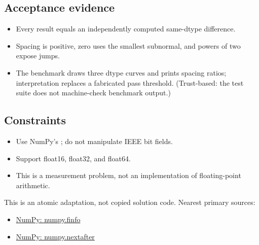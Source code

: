         \subsection{Acceptance evidence}

        \begin{evidencebox}
        \begin{itemize}
          \item Every result equals an independently computed same-dtype  difference.
  \item Spacing is positive, zero uses the smallest subnormal, and powers of two expose jumps.
  \item The benchmark draws three dtype curves and prints spacing ratios; interpretation replaces a fabricated pass threshold. (Trust-based: the test suite does not machine-check benchmark output.)
        \end{itemize}
        \end{evidencebox}

        \subsection{Constraints}

        \begin{itemize}
          \item Use NumPy's ; do not manipulate IEEE bit fields.
  \item Support float16, float32, and float64.
  \item This is a measurement problem, not an implementation of floating-point arithmetic.
        \end{itemize}

        \begin{sourcebox}
        This is an atomic adaptation, not copied solution code. Nearest primary sources:
        \begin{itemize}
          \item \href{https://numpy.org/doc/stable/reference/generated/numpy.finfo.html}{NumPy: numpy.finfo}
  \item \href{https://numpy.org/doc/stable/reference/generated/numpy.nextafter.html}{NumPy: numpy.nextafter}
        \end{itemize}
        \end{sourcebox}
